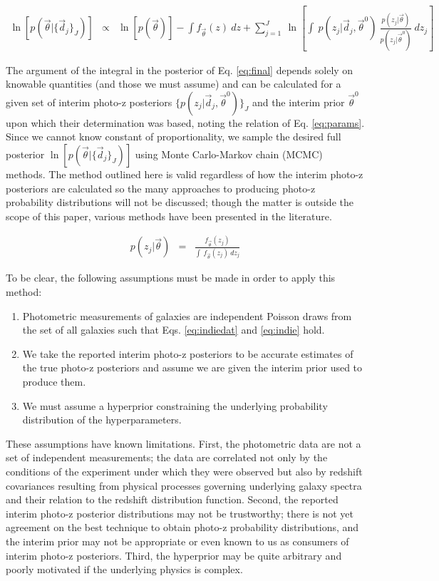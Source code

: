 \documentclass[preprint]{aastex}
\begin{document}
\begin{eqnarray}
\label{eq:final}
\ln[p(\vec{\theta}|\{\vec{d}_{j}\}_{J})] &\propto& \ln[p(\vec{\theta})]-\int 
f_{\vec{\theta}}(z)\ dz + \sum_{j=1}^{J}\ \ln\left[\int\ 
p(z_{j}|\vec{d}_{j},\vec{\theta}^{0})\ 
\frac{p(z_{j}|\vec{\theta})}{p(z_{j}|\vec{\theta}^{0})}\ dz_{j}\right]
\end{eqnarray}

The argument of the integral in the posterior of Eq. \ref{eq:final} depends 
solely on knowable quantities (and those we must assume) and can be calculated 
for a given set of interim photo-z posteriors 
$\{p(z_{j}|\vec{d}_{j},\vec{\theta}^{0})\}_{J}$ and the interim prior 
$\vec{\theta}^{0}$ upon which their determination was based, noting the 
relation of Eq. \ref{eq:params}.  Since we cannot know constant of 
proportionality, we sample the desired full posterior 
$\ln[p(\vec{\theta}|\{\vec{d}_{j}\}_{J})]$ using Monte Carlo-Markov chain 
(MCMC) methods.  The method outlined here is valid regardless of how the 
interim photo-z posteriors are calculated so the many approaches to producing 
photo-z probability distributions will not be discussed; though the matter is 
outside the scope of this paper, various methods have been presented in the 
literature. \citep{Sheldon2012, Ball2008, CarrascoKind2013, CarrascoKind2014a}  

\begin{eqnarray}
\label{eq:params}
p(z_{j}|\vec{\theta}) &=& \frac{f_{\vec{\theta}}(z_{j})}{\int\ 
f_{\vec{\theta}}(z_{j})\ dz_{j}}
\end{eqnarray}

To be clear, the following assumptions must be made in order to apply this 
method:

\begin{enumerate}
\item Photometric measurements of galaxies are independent Poisson draws from 
the set of all galaxies such that Eqs. \ref{eq:indiedat} and \ref{eq:indie} 
hold.
\item We take the reported interim photo-z posteriors to be accurate estimates 
of the true photo-z posteriors and assume we are given the interim prior used 
to produce them.
\item We must assume a hyperprior constraining the underlying probability 
distribution of the hyperparameters.
\end{enumerate}

These assumptions have known limitations.  First, the photometric data are not 
a set of independent measurements; the data are correlated not only by the 
conditions of the experiment under which they were observed but also by 
redshift covariances resulting from physical processes governing underlying 
galaxy spectra and their relation to the redshift distribution function.  
Second, the reported interim photo-z posterior distributions may not be 
trustworthy; there is not yet agreement on the best technique to obtain photo-z 
probability distributions, and the interim prior may not be appropriate or even 
known to us as consumers of interim photo-z posteriors.  Third, the hyperprior 
may be quite arbitrary and poorly motivated if the underlying physics is 
complex.
\end{document}
